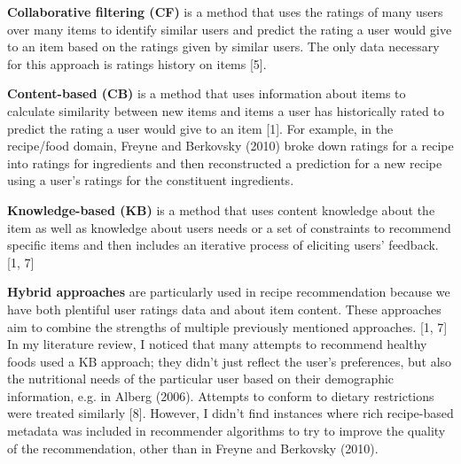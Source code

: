 \documentclass{article}
\begin{document}
\textbf{Collaborative filtering (CF)} is a method that uses the ratings of many users over many items to identify similar users and predict the rating a user would give to an item based on the ratings given by similar users. The only data necessary for this approach is ratings history on items [5].
\vspace{0.1in}

\textbf{Content-based (CB)} is a method that uses information about items to calculate similarity between new items and items a user has historically rated to predict the rating a user would give to an item [1]. For example, in the recipe/food domain, Freyne and Berkovsky (2010) broke down ratings for a recipe into ratings for ingredients and then reconstructed a prediction for a new recipe using a user's ratings for the constituent ingredients.
\vspace{0.1in}

\textbf{Knowledge-based (KB)} is a method that uses content knowledge about the item as well as knowledge about users needs or a set of constraints to recommend specific items and then includes an iterative process of eliciting users' feedback. [1, 7] 
\vspace{0.1in}

\textbf{Hybrid approaches} are particularly used in recipe recommendation because we have both plentiful user ratings data and about item content. These approaches aim to combine the strengths of multiple previously mentioned approaches. [1, 7]
\vspace{0.1in}
\\
In my literature review, I noticed that many attempts to recommend healthy foods used a KB approach; they didn't just reflect the user's preferences, but also the nutritional needs of the particular user based on their demographic information, e.g. in Alberg (2006). Attempts to conform to dietary restrictions were treated similarly [8]. However, I didn't find instances where rich recipe-based metadata was included in recommender algorithms to try to improve the quality of the recommendation, other than in Freyne and Berkovsky (2010). 
\end{document}
